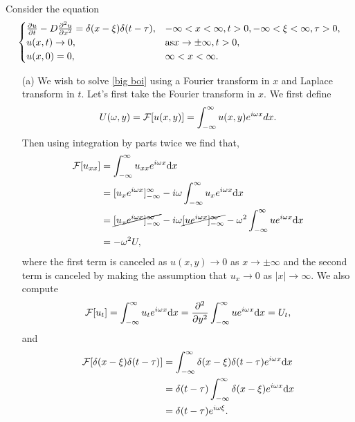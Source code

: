 \documentclass[12pt]{report}
\begin{document}
\begin{solution}
    \def\x{{\xi}}
    \def\t{{\tau}}
    \def\w{{\omega}}

    \noindent
    Consider the equation
    \begin{align} \label{big boi}
        \begin{cases} 
            \frac{\partial u}{\partial t} - D \frac{\partial^{2} u}{\partial x^{2}} = \delta(x - \xi)\delta(t - \tau),  &-\infty < x < \infty, t > 0, -\infty < \xi < \infty, \tau > 0,\\
            u(x,t) \to 0, &\text{as} x \to \pm \infty, t>0,\\
            u(x,0) = 0, &\infty<x<\infty. 
        \end{cases}
    \end{align}
    \begin{enumerate}
        \item[(a)]
        We wish to solve \ref{big boi} using a Fourier transform in $x$ and Laplace transform in $t$. Let's first take the Fourier transform in $x$. We first define
        \[ 
            U(\w,y) = \F[u(x,y)] = \int_{-\infty}^{\infty}u(x,y)e^{i\w x}dx.
        \]  
        Then using integration by parts twice we find that,
        \begin{align*}
            \F[u_{xx}] &= \int_{-\infty}^{\infty}u_{xx}e^{i\w x}\d x\\
            &= [u_x e^{i\w x}]_{-\infty}^{\infty} - i\w \int_{-\infty}^{\infty} u_x e^{i\w x}\d x\\
            &= \cancel{[u_x e^{i\w x}]_{-\infty}^{\infty}} - i\w \cancel{[ue^{i\w x}]_{-\infty}^\infty} - \w^2 \int_{-\infty}^{\infty} u e^{i \w x}\d x\\
            &= -\w^2 U,
        \end{align*}
        where the first term is canceled as $u(x,y) \to 0$ as $x \to \pm \infty$ and the second term is canceled by making the assumption that $u_x \to 0$ as $|x| \to \infty$. We also compute
        \[ 
            \F[u_{t}] = \int_{-\infty}^{\infty} u_{t}e^{i\w x}\d x = \ppn{2}{}{y}\int_{-\infty}^{\infty}ue^{i\w x} \d x = U_{t},
        \]
        and 
        \begin{align*}
            \F[\delta(x - \x)\delta(t - \t)] &= \int_{-\infty}^{\infty}\delta(x - \x)\delta(t - \t)e^{i \w x} \d x\\ 
            &= \delta(t - \t)\int_{-\infty}^{\infty}\delta(x - \x)e^{i \w x} \d x\\
            &= \delta(t - \t) e^{i\w\x}.
        \end{align*}

\end{enumerate}
\end{solution}
\end{document}
